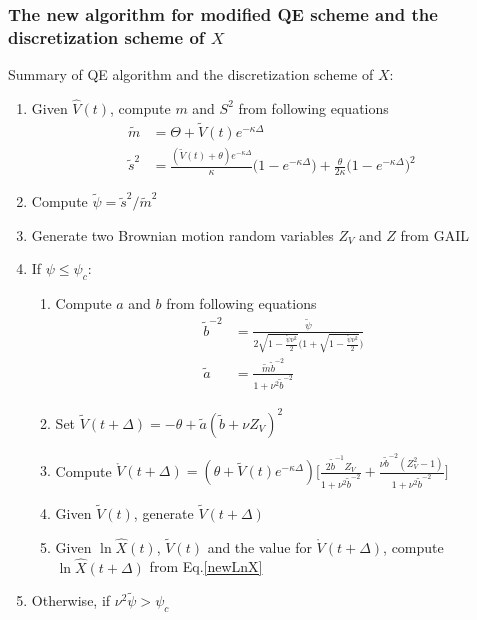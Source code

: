 \documentclass{ws-ijfe}
\begin{document}
\subsubsection{The new algorithm for modified QE scheme and the discretization scheme of $X$}
Summary of QE algorithm and the discretization scheme of $X$:\\
\begin{enumerate}
\item Given $\hat{V}(t)$, compute $m$ and $S^2$ from following equations
\begin{align*}
  \tilde{m} &=\Theta + \tilde{V}(t)e^{-\kappa\Delta} \\
  \tilde{s}^2 &=\frac{(\tilde{V}(t)+\theta) e^{-\kappa\Delta}}{\kappa}\bigg(1-e^{-\kappa\Delta}\bigg)+\frac{\theta}{2\kappa}\bigg(1-e^{-\kappa\Delta}\bigg)^2
\end{align*}
\item Compute $\tilde{\psi}=\tilde{s}^2/\tilde{m}^2$\\
\item Generate two Brownian motion random variables $Z_V$ and $Z$ from GAIL\\
\item If $\psi\leq\psi_c$:
\begin{enumerate}
\item Compute $a$ and $b$ from following equations
\begin{align*}
  \tilde{b}^{-2} & =\frac{\tilde{\psi}}{2\sqrt{1-\frac{\tilde{\psi}\nu^2}{2}}\bigg(1+\sqrt{1-\frac{\tilde{\psi}\nu^2}{2}}\bigg)}\\
  \tilde{a} & =\frac{\tilde{m}\tilde{b}^{-2}}{1+\nu^2\tilde{b}^{-2}}
\end{align*}
\item Set $\tilde{V}(t+\Delta)=-\theta + \tilde{a}(\tilde{b}+\nu Z_V)^2$
\item Compute $\mathring{V}(t+\Delta)={(\theta+\tilde{V}(t)e^{-\kappa\Delta})\bigg[\frac{2\tilde{b}^{-1}Z_V}{1+\nu^2\tilde{b}^{-2}}+\frac{\nu\tilde{b}^{-2}(Z_V^2-1)}{1+\nu^2\tilde{b}^{-2}}\bigg]}$
  \item Given $\tilde{V}(t)$, generate $\tilde{V}(t+\Delta)$
  \item Given $\ln\hat{X}(t)$, $\tilde{V}(t)$ and the value for $\mathring{V}(t+\Delta)$, compute $\ln \hat{X}(t+\Delta)$ from Eq.\eqref{newLnX}
\end{enumerate}
\item Otherwise, if $\nu^2\tilde{\psi}>\psi_c$

\end{enumerate}
\end{document}

